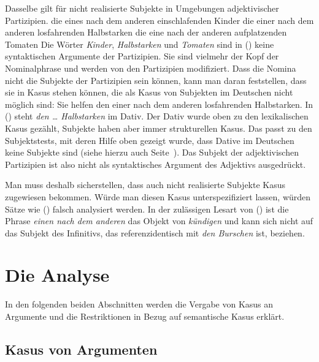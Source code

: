Dasselbe gilt für nicht realisierte Subjekte in Umgebungen adjektivischer Partizipien.
\eal
\label{bsp-nominativ-adj}
\ex die eines nach dem anderen einschlafenden Kinder
\ex die einer nach dem anderen losfahrenden   Halbstarken
\ex die eine  nach der anderen aufplatzenden  Tomaten
\zl
Die Wörter \emph{Kinder}, \emph{Halbstarken} und \emph{Tomaten} sind in () keine syntaktischen
Argumente der Partizipien. Sie sind vielmehr der Kopf der Nominalphrase und werden von den Partizipien
modifiziert. Dass die Nomina nicht die Subjekte der Partizipien sein können, kann man daran
feststellen, dass sie in Kasus stehen können, die als Kasus von Subjekten im Deutschen nicht möglich sind:
\ea
Sie helfen den einer nach dem anderen losfahrenden Halbstarken.
\z
In () steht \emph{den \ldots{} Halbstarken} im Dativ. Der Dativ wurde oben zu den lexikalischen
Kasus gezählt, Subjekte haben aber immer strukturellen Kasus. Das passt zu den Subjektstests, mit
deren Hilfe oben gezeigt wurde, dass Dative im Deutschen keine Subjekte sind (siehe hierzu auch Seite~\pageref{page-dativsubjekte}).
Das Subjekt der adjektivischen Partizipien ist also nicht als syntaktisches Argument des
Adjektivs ausgedrückt.

Man muss deshalb sicherstellen, dass auch nicht realisierte Subjekte Kasus zugewiesen bekommen.
Würde man diesen Kasus unterspezifiziert lassen, würden Sätze wie () falsch analysiert werden.
\z
In der zulässigen Lesart von () ist die Phrase 
\emph{einen nach dem anderen} das Objekt von \emph{kündigen} und kann
sich nicht auf das Subjekt des Infinitivs, das referenzidentisch
mit \emph{den Burschen} ist, beziehen.



\section{Die Analyse}

In den folgenden beiden Abschnitten werden die Vergabe von Kasus an Argumente und 
die Restriktionen in Bezug auf semantische Kasus erklärt. 


\subsection{Kasus von Argumenten}

